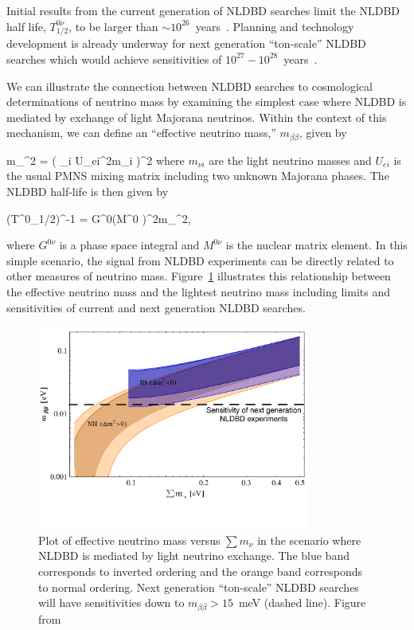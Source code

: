 Initial results from the current generation of NLDBD searches limit the NLDBD half life, $T^{0\nu}_{1/2}$, to be larger than  $\sim10^{26}$~years~\cite{Agostini:2013mzu,Auger:2012ar,Artusa:2014lgv,KamLAND-Zen:2016pfg}. %
 Planning and technology development is already underway for next generation ``ton-scale'' NLDBD searches which would achieve sensitivities of $10^{27}-10^{28}$~years~\cite{Geesaman:2015fha}.

We can illustrate the connection between NLDBD searches to cosmological determinations of neutrino mass by examining the simplest case where NLDBD is mediated by exchange of light Majorana neutrinos. Within the context of this mechanism, we can define an ``effective neutrino mass,'' $m_{\beta\beta}$, given by 

\beq
m_{\beta\beta}^{2} = ( \sum_i U_{ei}^{2}m_{\nu i} )^{2}
\label{eq:mbb}
\eeq
where $m_{\nu i}$ are the light neutrino masses and $U_{ei}$ is the usual PMNS mixing matrix including two unknown Majorana phases. The NLDBD half-life is then given by 

\beq
(T^{0\nu}_{1/2})^{-1} = G^{0\nu}\cdot (M^{0\nu} )^{2}\cdot m_{\beta\beta}^2,
\eeq

where $G^{0\nu}$ is a phase space integral and $M^{0\nu}$ is the nuclear matrix element. In this simple scenario, the signal from NLDBD experiments can be directly related to other measures of neutrino mass. Figure~\ref{fig:NLDBD} illustrates this relationship between the effective neutrino mass and the lightest neutrino mass including limits and sensitivities of current and next generation NLDBD searches.

\begin{figure}[h!]
\centering \includegraphics[width=0.8\textwidth]{Neutrinos/mbb_v_sum_m_nu.pdf}
\caption{Plot of effective neutrino mass versus $\sum m_\nu$ in the scenario where NLDBD is mediated by light neutrino exchange. The blue band corresponds to inverted ordering and the orange band corresponds to normal ordering. Next generation ``ton-scale'' NLDBD searches will have sensitivities down to $m_{\beta\beta}>15$~meV (dashed line). Figure from~\cite{Dell'Oro:2014yca}}
\label{fig:NLDBD}
\end{figure}

